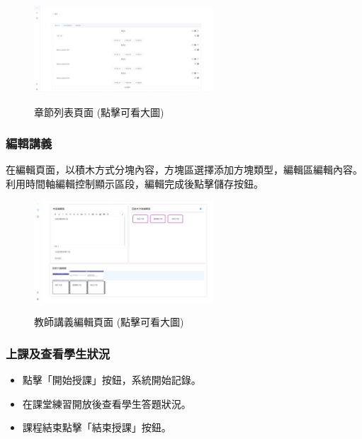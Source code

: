 \documentclass[12pt]{article}
\begin{document}
\begin{figure}[H]
  \centering
  \href{https://raw.githubusercontent.com/programingtw/proglearn-plan/main/2023全國大專校院智慧創新暨跨域整合創作競賽/img/chapter.png}{
    \includegraphics[width=0.60\textwidth]{./img/chapter.png}
  }
  \caption{章節列表頁面 (點擊可看大圖)}
\end{figure}

\subsubsection{編輯講義}
在編輯頁面，以積木方式分塊內容，方塊區選擇添加方塊類型，編輯區編輯內容。
利用時間軸編輯控制顯示區段，編輯完成後點擊儲存按鈕。

\begin{figure}[H]
  \centering
  \href{https://raw.githubusercontent.com/programingtw/proglearn-plan/main/2023全國大專校院智慧創新暨跨域整合創作競賽/img/teacher2.png}{
    \includegraphics[width=0.60\textwidth]{./img/teacher2.png}
  }
  \caption{教師講義編輯頁面 (點擊可看大圖)}
\end{figure}

\subsubsection{上課及查看學生狀況}

\begin{itemize}
  \item 點擊「開始授課」按鈕，系統開始記錄。
  \item 在課堂練習開放後查看學生答題狀況。
  \item 課程結束點擊「結束授課」按鈕。
\end{itemize}
\end{document}
